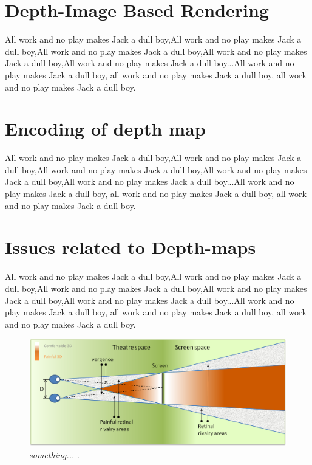 \section{Depth-Image Based Rendering}
All work and no play makes Jack a dull boy,All work and no play makes Jack a dull boy,All work and no play makes Jack a dull boy,All work and no play makes Jack a dull boy,All work and no play makes Jack a dull boy...All work and no play makes Jack a dull boy, all work and no play makes Jack a dull boy, all work and no play makes Jack a dull boy.

\section{Encoding of depth map}
All work and no play makes Jack a dull boy,All work and no play makes Jack a dull boy,All work and no play makes Jack a dull boy,All work and no play makes Jack a dull boy,All work and no play makes Jack a dull boy...All work and no play makes Jack a dull boy, all work and no play makes Jack a dull boy, all work and no play makes Jack a dull boy.

\section{Issues related to Depth-maps}
All work and no play makes Jack a dull boy,All work and no play makes Jack a dull boy,All work and no play makes Jack a dull boy,All work and no play makes Jack a dull boy,All work and no play makes Jack a dull boy...All work and no play makes Jack a dull boy, all work and no play makes Jack a dull boy, all work and no play makes Jack a dull boy.

\begin{figure}[ht]
\centerline{\includegraphics[width=1.0\textwidth]{Stereoscopic_comfort_zone.png}}
\caption{\textit{something... \cite{bib:video_production}} \label{fig:Stereoscopic_comfort_zone}.}
\end{figure}



